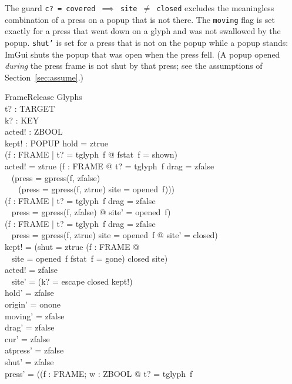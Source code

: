 \documentclass[a4paper,10pt,fleqn]{article}
\begin{document}
The guard \texttt{c?~=~covered~$\implies$~site~$\neq$~closed} excludes the
meaningless combination of a press on a popup that is not there.  The
\texttt{moving} flag is set exactly for a press that went down on a glyph and
was not swallowed by the popup.  \texttt{shut'} is set for a press that is not
on the popup while a popup stands: ImGui shuts the popup that was open when the
press fell.  (A popup opened \emph{during} the press frame is not shut by that
press; see the assumptions of Section~\ref{sec:assume}.)

\begin{schema}{FrameRelease}
  \Delta Glyphs \\
  t? : TARGET \\
  k? : KEY \\
  acted! : ZBOOL \\
  kept! : POPUP
\where
  hold = ztrue \\
  (\forall f : FRAME | t? = tglyph~f @ fstat~f = shown) \\
  acted! = ztrue \iff (\exists f : FRAME @ t? = tglyph~f \land drag = zfalse \\
  \quad~ \land (press = gpress(f, zfalse) \\
  \quad~ \quad~ \lor (press = gpress(f, ztrue) \land site = opened~f))) \\
  (\forall f : FRAME | t? = tglyph~f \land drag = zfalse \\
  \quad~ \land press = gpress(f, zfalse) @ site' = opened~f) \\
  (\forall f : FRAME | t? = tglyph~f \land drag = zfalse \\
  \quad~ \land press = gpress(f, ztrue) \land site = opened~f @ site' = closed) \\
  kept! = (\IF shut = ztrue \lor (\exists f : FRAME @ \\
  \quad~ site = opened~f \land fstat~f = gone) \THEN closed \ELSE site) \\
  acted! = zfalse \implies \\
  \quad~ site' = (\IF k? = escape \THEN closed \ELSE kept!) \\
  hold' = zfalse \\
  origin' = onone \\
  moving' = zfalse \\
  drag' = zfalse \\
  cur' = zfalse \\
  atpress' = zfalse \\
  shut' = zfalse \\
  press' = (\IF (\exists f : FRAME; w : ZBOOL @ t? = tglyph~f \\

\end{schema}
\end{document}
